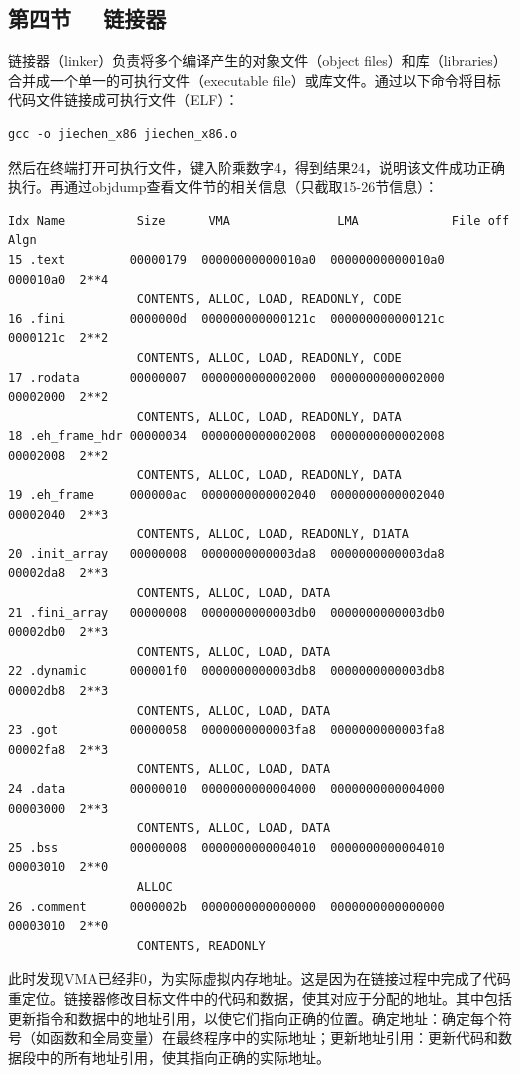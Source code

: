 \documentclass[UTF8,a4paper,10pt]{ctexart}
\begin{document}
\subsection{第四节 \ \ 链接器}
链接器（linker）负责将多个编译产生的对象文件（object files）和库（libraries）合并成一个单一的可执行文件（executable file）或库文件。通过以下命令将目标代码文件链接成可执行文件（ELF）：
\begin{lstlisting}[frame=trbl]
gcc -o jiechen_x86 jiechen_x86.o
\end{lstlisting}\par
然后在终端打开可执行文件，键入阶乘数字4，得到结果24，说明该文件成功正确执行。再通过objdump查看文件节的相关信息（只截取15-26节信息）：
\begin{lstlisting}[frame=trbl]
Idx Name          Size      VMA               LMA             File off  Algn
15 .text         00000179  00000000000010a0  00000000000010a0  000010a0  2**4
                  CONTENTS, ALLOC, LOAD, READONLY, CODE
16 .fini         0000000d  000000000000121c  000000000000121c  0000121c  2**2
                  CONTENTS, ALLOC, LOAD, READONLY, CODE
17 .rodata       00000007  0000000000002000  0000000000002000  00002000  2**2
                  CONTENTS, ALLOC, LOAD, READONLY, DATA
18 .eh_frame_hdr 00000034  0000000000002008  0000000000002008  00002008  2**2
                  CONTENTS, ALLOC, LOAD, READONLY, DATA
19 .eh_frame     000000ac  0000000000002040  0000000000002040  00002040  2**3
                  CONTENTS, ALLOC, LOAD, READONLY, D1ATA
20 .init_array   00000008  0000000000003da8  0000000000003da8  00002da8  2**3
                  CONTENTS, ALLOC, LOAD, DATA
21 .fini_array   00000008  0000000000003db0  0000000000003db0  00002db0  2**3
                  CONTENTS, ALLOC, LOAD, DATA
22 .dynamic      000001f0  0000000000003db8  0000000000003db8  00002db8  2**3
                  CONTENTS, ALLOC, LOAD, DATA
23 .got          00000058  0000000000003fa8  0000000000003fa8  00002fa8  2**3
                  CONTENTS, ALLOC, LOAD, DATA
24 .data         00000010  0000000000004000  0000000000004000  00003000  2**3
                  CONTENTS, ALLOC, LOAD, DATA
25 .bss          00000008  0000000000004010  0000000000004010  00003010  2**0
                  ALLOC
26 .comment      0000002b  0000000000000000  0000000000000000  00003010  2**0
                  CONTENTS, READONLY
\end{lstlisting}\par
此时发现VMA已经非0，为实际虚拟内存地址。这是因为在链接过程中完成了代码重定位。链接器修改目标文件中的代码和数据，使其对应于分配的地址。其中包括更新指令和数据中的地址引用，以使它们指向正确的位置。确定地址：确定每个符号（如函数和全局变量）在最终程序中的实际地址；更新地址引用：更新代码和数据段中的所有地址引用，使其指向正确的实际地址。\par
\end{document}
